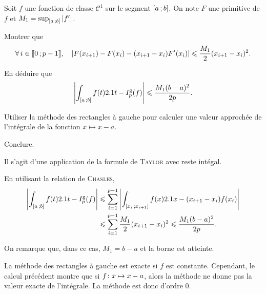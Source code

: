 \begin{exercice}
Soit $f$ une fonction de classe $\mathscr{C}^1$ sur le segment $\interff{a}{b}$. On note $F$ une primitive de $f$ et $M_1 = \sup_{\interff{a}{b}} \module{f'}$.
\begin{questions}
\item Montrer que
\[
\forall i \in \interent{0}{p-1},\quad 
\module{F(x_{i+1}) - F(x_i) - (x_{i+1} - x_i) F'(x_i)} \leqslant \frac{M_1}{2} (x_{i+1}-x_i)^2.
\]

\item En déduire que
\[
\module{\int_{\interff{a}{b}} f(t) \d t - I_p^\mathrm{g}(f)}
\leqslant \frac{M_1 (b-a)^2}{2 p}.
\]

\item Utiliser la méthode des rectangles à gauche pour calculer une valeur approchée de l'intégrale de la fonction $x \mapsto x - a$.

\item Conclure.
\end{questions}
\end{exercice}

\begin{elemsolution}

\begin{reponses}
\item Il s'agit d'une application de la formule de \textsc{Taylor} avec reste intégal.

\item En utilisant la relation de \textsc{Chasles},
\begin{align*}
\module{\int_{\interff{a}{b}} f(t) \d t - I_p^\mathrm{g}(f)}
&\leqslant \sum_{i=1}^{p-1} \module{\int_{\interff{x_i}{x_{i+1}}} f(x) \d x - (x_{i+1} - x_i) f(x_i)}\\
&\leqslant \sum_{i=1}^{p-1} \frac{M_1}{2} (x_{i+1} - x_i)^2
\leqslant \frac{M_1 (b-a)^2}{2 p}.
\end{align*}

\item On remarque que, dans ce cas, $M_1 = b - a$ et la borne est atteinte.

\item La méthode des rectangles à gauche est exacte si $f$ est constante. Cependant, le calcul précédent montre que si $\fonctionligne[f]{x}{x - a}$, alors la méthode ne donne pas la valeur exacte de l'intégrale. La méthode est donc d'ordre $0$.
\end{reponses}
\end{elemsolution}

